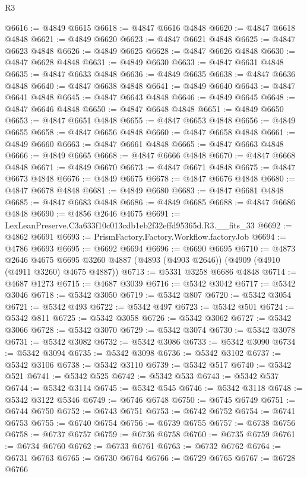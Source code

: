 \begin{lexlean}{R3}
\begin{coremodule}
@6616 := @4849 @6615
@6618 := @4847 @6616 @4848
@6620 := @4847 @6618 @4848
@6621 := @4849 @6620
@6623 := @4847 @6621 @4848
@6625 := @4847 @6623 @4848
@6626 := @4849 @6625
@6628 := @4847 @6626 @4848
@6630 := @4847 @6628 @4848
@6631 := @4849 @6630
@6633 := @4847 @6631 @4848
@6635 := @4847 @6633 @4848
@6636 := @4849 @6635
@6638 := @4847 @6636 @4848
@6640 := @4847 @6638 @4848
@6641 := @4849 @6640
@6643 := @4847 @6641 @4848
@6645 := @4847 @6643 @4848
@6646 := @4849 @6645
@6648 := @4847 @6646 @4848
@6650 := @4847 @6648 @4848
@6651 := @4849 @6650
@6653 := @4847 @6651 @4848
@6655 := @4847 @6653 @4848
@6656 := @4849 @6655
@6658 := @4847 @6656 @4848
@6660 := @4847 @6658 @4848
@6661 := @4849 @6660
@6663 := @4847 @6661 @4848
@6665 := @4847 @6663 @4848
@6666 := @4849 @6665
@6668 := @4847 @6666 @4848
@6670 := @4847 @6668 @4848
@6671 := @4849 @6670
@6673 := @4847 @6671 @4848
@6675 := @4847 @6673 @4848
@6676 := @4849 @6675
@6678 := @4847 @6676 @4848
@6680 := @4847 @6678 @4848
@6681 := @4849 @6680
@6683 := @4847 @6681 @4848
@6685 := @4847 @6683 @4848
@6686 := @4849 @6685
@6688 := @4847 @6686 @4848
@6690 := @4856 @2646 @4675
@6691 := LexLeanPreserve.C3a633f10c013cdb1eb2f32effd95365d.R3.__fits_33
@6692 := @4862 @6691
@6693 := PrismFactory.Factory.Workflow.factoryJob
@6694 := @4786 @6693
@6695 := @6692 @6694
@6696 := @6690 @6695
@6710 := @4873
    @2646
    @4675
    @6695
    @3260
    @4887
    (@4893 (@4903 @2646))
    (@4909 (@4910 (@4911 @3260) @4675 @4887))
@6713 := @5331 @3258 @6686 @4848
@6714 := @4687 @1273
@6715 := @4687 @3039
@6716 := @5342 @3042
@6717 := @5342 @3046
@6718 := @5342 @3050
@6719 := @5342 @807
@6720 := @5342 @3054
@6721 := @5342 @493
@6722 := @5342 @497
@6723 := @5342 @501
@6724 := @5342 @811
@6725 := @5342 @3058
@6726 := @5342 @3062
@6727 := @5342 @3066
@6728 := @5342 @3070
@6729 := @5342 @3074
@6730 := @5342 @3078
@6731 := @5342 @3082
@6732 := @5342 @3086
@6733 := @5342 @3090
@6734 := @5342 @3094
@6735 := @5342 @3098
@6736 := @5342 @3102
@6737 := @5342 @3106
@6738 := @5342 @3110
@6739 := @5342 @517
@6740 := @5342 @521
@6741 := @5342 @525
@6742 := @5342 @533
@6743 := @5342 @537
@6744 := @5342 @3114
@6745 := @5342 @545
@6746 := @5342 @3118
@6748 := @5342 @3122 @5346
@6749 := @6746 @6748
@6750 := @6745 @6749
@6751 := @6744 @6750
@6752 := @6743 @6751
@6753 := @6742 @6752
@6754 := @6741 @6753
@6755 := @6740 @6754
@6756 := @6739 @6755
@6757 := @6738 @6756
@6758 := @6737 @6757
@6759 := @6736 @6758
@6760 := @6735 @6759
@6761 := @6734 @6760
@6762 := @6733 @6761
@6763 := @6732 @6762
@6764 := @6731 @6763
@6765 := @6730 @6764
@6766 := @6729 @6765
@6767 := @6728 @6766

\end{coremodule}
\end{lexlean}
